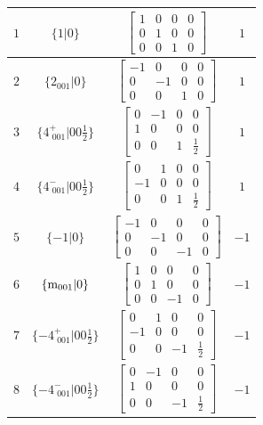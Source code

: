 \documentclass[fleqn,8pt]{jsarticle}
\begin{document}
\begin{longtable}{cccc}
$ 1 $ & $ \{1|0\} $ & $ \begin{bmatrix} 1 & 0 & 0 & 0 \\ 0 & 1 & 0 & 0 \\ 0 & 0 & 1 & 0 \end{bmatrix} $ & $ 1 $ \\ \hline
$ 2 $ & $ \{2{}_{001}|0\} $ & $ \begin{bmatrix} -1 & 0 & 0 & 0 \\ 0 & -1 & 0 & 0 \\ 0 & 0 & 1 & 0 \end{bmatrix} $ & $ 1 $ \\ \hline
$ 3 $ & $ \{4^{+}_{\,\,001}|0 0 \frac{1}{2}\} $ & $ \begin{bmatrix} 0 & -1 & 0 & 0 \\ 1 & 0 & 0 & 0 \\ 0 & 0 & 1 & \frac{1}{2} \end{bmatrix} $ & $ 1 $ \\ \hline
$ 4 $ & $ \{4^{-}_{\,\,001}|0 0 \frac{1}{2}\} $ & $ \begin{bmatrix} 0 & 1 & 0 & 0 \\ -1 & 0 & 0 & 0 \\ 0 & 0 & 1 & \frac{1}{2} \end{bmatrix} $ & $ 1 $ \\ \hline
$ 5 $ & $ \{-1|0\} $ & $ \begin{bmatrix} -1 & 0 & 0 & 0 \\ 0 & -1 & 0 & 0 \\ 0 & 0 & -1 & 0 \end{bmatrix} $ & $ -1 $ \\ \hline
$ 6 $ & $ \{{\rm m}_{001}|0\} $ & $ \begin{bmatrix} 1 & 0 & 0 & 0 \\ 0 & 1 & 0 & 0 \\ 0 & 0 & -1 & 0 \end{bmatrix} $ & $ -1 $ \\ \hline
$ 7 $ & $ \{-4^{+}_{\,\,001}|0 0 \frac{1}{2}\} $ & $ \begin{bmatrix} 0 & 1 & 0 & 0 \\ -1 & 0 & 0 & 0 \\ 0 & 0 & -1 & \frac{1}{2} \end{bmatrix} $ & $ -1 $ \\ \hline
$ 8 $ & $ \{-4^{-}_{\,\,001}|0 0 \frac{1}{2}\} $ & $ \begin{bmatrix} 0 & -1 & 0 & 0 \\ 1 & 0 & 0 & 0 \\ 0 & 0 & -1 & \frac{1}{2} \end{bmatrix} $ & $ -1 $ \\
\end{longtable}
\end{document}
